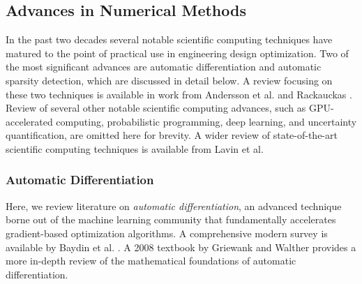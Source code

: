 \documentclass[12pt,vi,oneside,table]{report}
\begin{document}
%
%
%

    \subsection{Advances in Numerical Methods}

    In the past two decades several notable scientific computing techniques have matured to the point of practical use in engineering design optimization. Two of the most significant advances are automatic differentiation and automatic sparsity detection, which are discussed in detail below. A review focusing on these two techniques is available in work from Andersson et al. \cite{casadi} and Rackauckas \cite{rackauckas_generalizing_2021}. Review of several other notable scientific computing advances, such as GPU-accelerated computing, probabilistic programming, deep learning, and uncertainty quantification, are omitted here for brevity. A wider review of state-of-the-art scientific computing techniques is available from Lavin et al. \cite{lavin_simulation_2022}

    \subsubsection{Automatic Differentiation}

    Here, we review literature on \textit{automatic differentiation}, an advanced technique borne out of the machine learning community that fundamentally accelerates gradient-based optimization algorithms. A comprehensive modern survey is available by Baydin et al. \cite{baydin_automatic_2018}. A 2008 textbook by Griewank and Walther \cite{griewank_evaluating_2008} provides a more in-depth review of the mathematical foundations of automatic differentiation.
\end{document}
